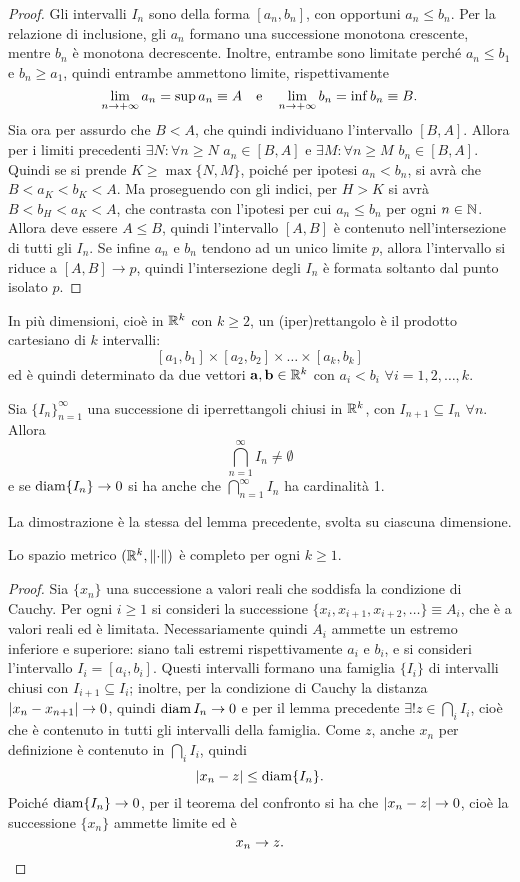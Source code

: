 \begin{proof}
Gli intervalli $I_n$ sono della forma $[a_n,b_n]$, con opportuni $a_n\leq b_n$. Per la relazione di inclusione, gli $a_n$ formano una successione monotona crescente, mentre $b_n$ è monotona decrescente. Inoltre, entrambe sono limitate perché $a_n\leq b_1$ e $b_n\geq a_1$, quindi entrambe ammettono limite, rispettivamente
\[
\lim_{n\to+\infty}a_n=\sup a_n\equiv A\quad\text{e}\quad\lim_{n\to+\infty}b_n=\inf b_n\equiv B.
\]
Sia ora per assurdo che $B<A$, che quindi individuano l'intervallo $[B,A]$. Allora per i limiti precedenti $\exists N\colon\forall n\geq N$ $a_n\in[B,A]$ e $\exists M\colon\forall n\geq M$ $b_n\in[B,A]$. Quindi se si prende $K\geq\max\{N,M\}$, poiché per ipotesi $a_n<b_n$, si avrà che $B<a_K<b_K<A$. Ma proseguendo con gli indici, per $H>K$ si avrà $B<b_H<a_K<A$, che contrasta con l'ipotesi per cui $a_n\leq b_n$ per ogni $n\in\mathbb{N}$. Allora deve essere $A\leq B$, quindi l'intervallo $[A,B]$ è contenuto nell'intersezione di tutti gli $I_n$. Se infine $a_n$ e $b_n$ tendono ad un unico limite $p$, allora l'intervallo si riduce a $[A,B]\to p$, quindi l'intersezione degli $I_n$ è formata soltanto dal punto isolato $p$.
\end{proof}
In più dimensioni, cioè in $\mathbb{R}^k$ con $k\geq 2$, un (iper)rettangolo è il prodotto cartesiano di $k$ intervalli:
\[
[a_1,b_1]\times[a_2,b_2]\times\dots\times[a_k,b_k]
\]
ed è quindi determinato da due vettori $\mathbf{a},\mathbf{b}\in\mathbb{R}^k$ con $a_i<b_i$ $\forall i=1,2,\dots,k$.
\begin{lemma}
Sia $\{I_n\}_{n=1}^{\infty}$ una successione di iperrettangoli chiusi in $\mathbb{R}^k$, con $I_{n+1}\subseteq I_n$ $\forall n$. Allora
\[
\bigcap_{n=1}^{\infty} I_n\neq\emptyset
\]
e se $\operatorname{diam}\{I_n\}\to 0$ si ha anche che $\bigcap_{n=1}^{\infty} I_n$ ha cardinalità 1.
\end{lemma}
La dimostrazione è la stessa del lemma precedente, svolta su ciascuna dimensione.
\begin{teorema}
\label{t:completo}
Lo spazio metrico $(\mathbb{R}^k,\left\|{\cdot}\right\|)$ è completo per ogni $k\geq 1$.
\end{teorema}
\begin{proof}
Sia $\{x_n\}$ una successione a valori reali che soddisfa la condizione di Cauchy. Per ogni $i\geq 1$ si consideri la successione $\{x_i,x_{i+1},x_{i+2},\dots\}\equiv A_i$, che è a valori reali ed è limitata. Necessariamente quindi $A_i$ ammette un estremo inferiore e superiore: siano tali estremi rispettivamente $a_i$ e $b_i$, e si consideri l'intervallo $I_i=[a_i,b_i]$.
Questi intervalli formano una famiglia $\{I_i\}$ di intervalli chiusi con $I_{i+1}\subseteq I_i$; inoltre, per la condizione di Cauchy la distanza $\left|{x_n-x_{n+1}}\right|\to 0$, quindi $\operatorname{diam} I_n\to 0$ e per il lemma precedente $\exists! z\in\bigcap\nolimits _i I_i$, cioè che è contenuto in tutti gli intervalli della famiglia. Come $z$, anche $x_n$ per definizione è contenuto in $\bigcap\nolimits _i I_i$, quindi
\[
\left|{x_n-z}\right|\leq\operatorname{diam}\{I_n\}.
\]
Poiché $\operatorname{diam}\{I_n\}\to 0$, per il teorema del confronto si ha che $\left|{x_n-z}\right|\to 0$, cioè la successione $\{x_n\}$ ammette limite ed è
\[
x_n\to z.\qedhere
\]
\end{proof}
